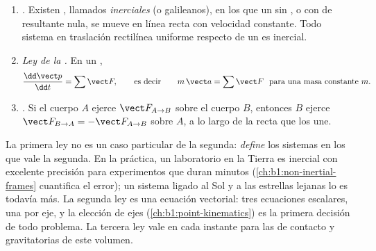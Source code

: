 \begin{theorem}\label{thm:b1:newton-dynamics:laws}
\begin{enumerate}
  \item \emph{.} Existen ,
        llamados \emph{inerciales} (o galileanos), en los que un  sin , o con  de resultante nula, se mueve
        en línea recta con velocidad constante. Todo sistema en traslación
        rectilínea uniforme respecto de un  es inercial.
  \item \emph{Ley de la .} En un ,
        \[
        \frac{\dd\vect p}{\dd t} = \sum\vect F, \qquad \text{es decir}\qquad
        m\,\vect a = \sum\vect F \ \text{ para una masa constante } m .
        \]
  \item \emph{.} Si el cuerpo $A$ ejerce $\vect F_{A\to B}$
        sobre el cuerpo $B$, entonces $B$ ejerce $\vect F_{B\to A} = -\vect F_{A\to B}$
        sobre $A$, a lo largo de la recta que los une.
\end{enumerate}
\end{theorem}
\admitted

\begin{remark}\label{rem:b1:newton-dynamics:meaning}
La primera ley no es un caso particular de la segunda: \emph{define} los
sistemas en los que vale la segunda. En la práctica, un laboratorio en la
Tierra es inercial con excelente precisión para experimentos que duran
minutos (\cref{ch:b1:non-inertial-frames} cuantifica el error); un sistema
ligado al Sol y a las estrellas lejanas lo es todavía más. La segunda ley
es una ecuación vectorial: tres ecuaciones escalares, una por eje, y la
elección de ejes (\cref{ch:b1:point-kinematics}) es la primera decisión de
todo problema. La tercera ley vale en cada instante para las  de
contacto y gravitatorias de este volumen.
\end{remark}

